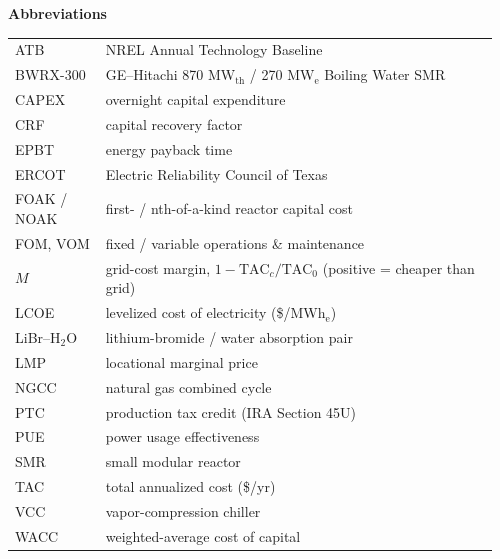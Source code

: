 \documentclass[a4paper,fleqn]{cas-sc}
\begin{document}
\begin{minipage}[t]{0.49\linewidth}
\par\medskip
\noindent\textbf{Abbreviations}\par\smallskip
\begin{tabular}{@{}p{0.18\linewidth}p{0.78\linewidth}@{}}
ATB        & NREL Annual Technology Baseline \\
BWRX-300   & GE--Hitachi 870 MW$_\mathrm{th}$ / 270 MW$_\mathrm{e}$ Boiling Water SMR \\
CAPEX      & overnight capital expenditure \\
CRF        & capital recovery factor \\
EPBT       & energy payback time \\
ERCOT      & Electric Reliability Council of Texas \\
FOAK / NOAK & first- / nth-of-a-kind reactor capital cost \\
FOM, VOM   & fixed / variable operations \& maintenance \\
$M$        & grid-cost margin, $1 - \mathrm{TAC}_c / \mathrm{TAC}_0$ (positive = cheaper than grid) \\
LCOE       & levelized cost of electricity (\$/MWh$_\mathrm{e}$) \\
LiBr--H$_2$O & lithium-bromide / water absorption pair \\
LMP        & locational marginal price \\
NGCC       & natural gas combined cycle \\
PTC        & production tax credit (IRA Section 45U) \\
PUE        & power usage effectiveness \\
SMR        & small modular reactor \\
TAC        & total annualized cost (\$/yr) \\
VCC        & vapor-compression chiller \\
WACC       & weighted-average cost of capital \\
\end{tabular}

\end{minipage}\hfill%
\end{document}
